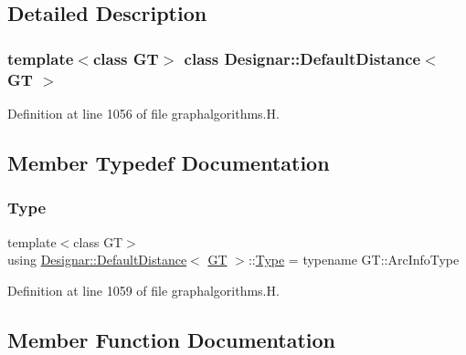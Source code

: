 \subsection{Detailed Description}
\subsubsection*{template$<$class GT$>$\newline
class Designar\+::\+Default\+Distance$<$ G\+T $>$}



Definition at line 1056 of file graphalgorithms.\+H.



\subsection{Member Typedef Documentation}
\mbox{\label{class_designar_1_1_default_distance_a9317a5edf566779550b96edd532b502b}} 
\subsubsection{\texorpdfstring{Type}{Type}}
{\footnotesize\ttfamily template$<$class GT$>$ \\
using \hyperlink{class_designar_1_1_default_distance}{Designar\+::\+Default\+Distance}$<$ \hyperlink{demo-buildgraph_8_c_a3001c40d2c31ca87ed96cd7d1334a55e}{GT} $>$\+::\hyperlink{class_designar_1_1_default_distance_a9317a5edf566779550b96edd532b502b}{Type} =  typename G\+T\+::\+Arc\+Info\+Type}



Definition at line 1059 of file graphalgorithms.\+H.



\subsection{Member Function Documentation}
\mbox{\label{class_designar_1_1_default_distance_ac601666aabb51229c4ceff72cd7d82db}} 
